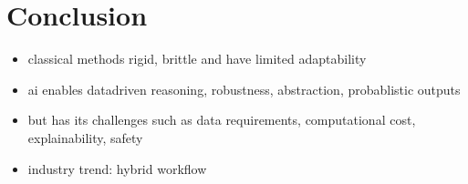 \section{Conclusion}
\begin{itemize}
	\item classical methods rigid, brittle and have limited adaptability
	\item ai enables datadriven reasoning, robustness, abstraction, probablistic outputs
	\item but has its challenges such as data requirements, computational cost, explainability, safety
	\item industry trend: hybrid workflow
\end{itemize}